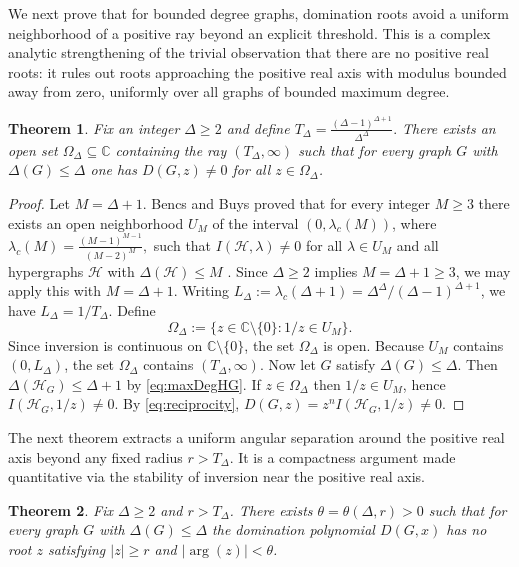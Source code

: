 \documentclass[11pt]{amsart}
\newtheorem{theorem}{Theorem}
\numberwithin{equation}{section}
\DeclareMathOperator{\argu}{arg}
\newcommand{\HH}{\mathcal{H}}
\newcommand{\bbC}{\mathbb{C}}
\begin{document}
We next prove that for bounded degree graphs, domination roots avoid a uniform neighborhood of a positive ray beyond an explicit threshold. This is a complex analytic strengthening of the trivial observation that there are no positive real roots: it rules out roots approaching the positive real axis with modulus bounded away from zero, uniformly over all graphs of bounded maximum degree.

\begin{theorem}\label{thm:rayZeroFree}
Fix an integer $\Delta\ge 2$ and define $T_{\Delta}=\frac{(\Delta-1)^{\Delta+1}}{\Delta^{\Delta}}.$ There exists an open set $\Omega_{\Delta}\subseteq \bbC$ containing the ray $(T_{\Delta},\infty)$ such that for every graph $G$ with $\Delta(G)\le \Delta$ one has $D(G,z)\neq 0$ for all $z\in \Omega_{\Delta}$.
\end{theorem}

\begin{proof}
Let $M=\Delta+1$. Bencs and Buys proved that for every integer $M\ge 3$ there exists an open neighborhood $U_M$ of the interval $(0,\lambda_c(M))$, where $\lambda_c(M)=\frac{(M-1)^{M-1}}{(M-2)^{M}},$ such that $I(\HH,\lambda)\neq 0$ for all $\lambda\in U_M$ and all hypergraphs $\HH$ with $\Delta(\HH)\le M$ \cite{BencsBuys2025}. Since $\Delta\ge 2$ implies $M=\Delta+1\ge 3$, we may apply this with $M=\Delta+1$. Writing $L_{\Delta}:=\lambda_c(\Delta+1)=\Delta^{\Delta}/(\Delta-1)^{\Delta+1}$, we have $L_{\Delta}=1/T_{\Delta}$. Define
\[
\Omega_{\Delta}:=\{z\in\bbC\setminus\{0\}:1/z\in U_M\}.
\]
Since inversion is continuous on $\bbC\setminus\{0\}$, the set $\Omega_{\Delta}$ is open. Because $U_M$ contains $(0,L_{\Delta})$, the set $\Omega_{\Delta}$ contains $(T_{\Delta},\infty)$. Now let $G$ satisfy $\Delta(G)\le \Delta$. Then $\Delta(\HH_G)\le \Delta+1$ by \eqref{eq:maxDegHG}. If $z\in\Omega_{\Delta}$ then $1/z\in U_M$, hence $I(\HH_G,1/z)\neq 0$. By \eqref{eq:reciprocity}, $D(G,z)=z^{n}I(\HH_G,1/z)\neq 0$.
\end{proof}

The next theorem extracts a uniform angular separation around the positive real axis beyond any fixed radius $r>T_{\Delta}$. It is a compactness argument made quantitative via the stability of inversion near the positive real axis.

\begin{theorem}\label{thm:angularSeparation}
Fix $\Delta\ge 2$ and $r>T_{\Delta}$. There exists $\theta=\theta(\Delta,r)>0$ such that for every graph $G$ with $\Delta(G)\le \Delta$ the domination polynomial $D(G,x)$ has no root $z$ satisfying $|z|\ge r$ and $|\argu(z)|<\theta$.
\end{theorem}
\end{document}
